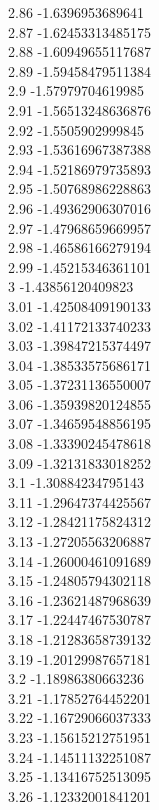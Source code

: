 {2.86	-1.6396953689641\\
2.87	-1.62453313485175\\
2.88	-1.60949655117687\\
2.89	-1.59458479511384\\
2.9	-1.57979704619985\\
2.91	-1.56513248636876\\
2.92	-1.5505902999845\\
2.93	-1.53616967387388\\
2.94	-1.52186979735893\\
2.95	-1.50768986228863\\
2.96	-1.49362906307016\\
2.97	-1.47968659669957\\
2.98	-1.46586166279194\\
2.99	-1.45215346361101\\
3	-1.43856120409823\\
3.01	-1.42508409190133\\
3.02	-1.41172133740233\\
3.03	-1.39847215374497\\
3.04	-1.38533575686171\\
3.05	-1.37231136550007\\
3.06	-1.35939820124855\\
3.07	-1.34659548856195\\
3.08	-1.33390245478618\\
3.09	-1.32131833018252\\
3.1	-1.30884234795143\\
3.11	-1.29647374425567\\
3.12	-1.28421175824312\\
3.13	-1.27205563206887\\
3.14	-1.26000461091689\\
3.15	-1.24805794302118\\
3.16	-1.23621487968639\\
3.17	-1.22447467530787\\
3.18	-1.21283658739132\\
3.19	-1.20129987657181\\
3.2	-1.18986380663236\\
3.21	-1.17852764452201\\
3.22	-1.16729066037333\\
3.23	-1.15615212751951\\
3.24	-1.14511132251087\\
3.25	-1.13416752513095\\
3.26	-1.12332001841201\\
}
